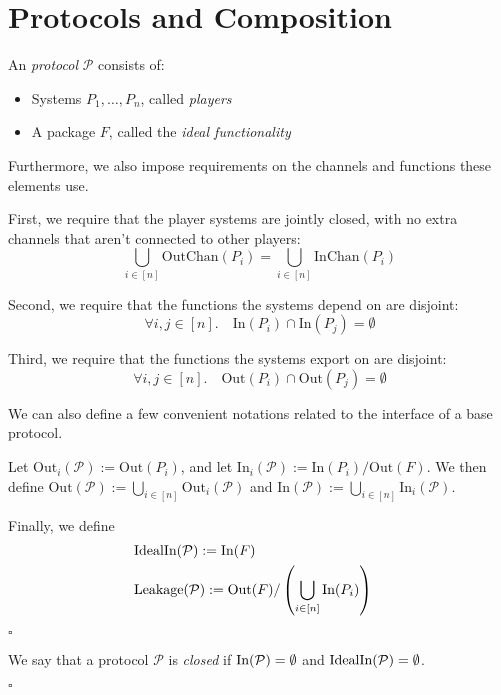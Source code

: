 \section{Protocols and Composition}

\begin{definition}[Protocols]
An \emph{protocol} $\mathcal{P}$ consists of:
\begin{itemize}
\item Systems $P_1, \ldots, P_n$, called \emph{players}
\item A package $F$, called the \emph{ideal functionality}
\end{itemize}

Furthermore, we also impose requirements on the channels and functions
these elements use.

First, we require that the player systems are jointly closed,
with no extra channels that aren't connected to other players:
$$
\bigcup_{i \in [n]} \text{OutChan}(P_i) = \bigcup_{i \in [n]} \text{InChan}(P_i)
$$

Second, we require that the functions the systems depend on are disjoint:
$$
\forall i, j \in [n].\quad \text{In}(P_i) \cap \text{In}(P_j) = \emptyset
$$

Third, we require that the functions the systems export on are disjoint:
$$
\forall i, j \in [n].\quad \text{Out}(P_i) \cap \text{Out}(P_j) = \emptyset
$$

We can also define a few convenient notations related to the interface of a base
protocol.

Let $\text{Out}_i(\mathcal{P}) := \text{Out}(P_i)$, and let $\text{In}_i(\mathcal{P}) := \text{In}(P_i) / \text{Out}(F)$.
We then define $\text{Out}(\mathcal{P}) := \bigcup_{i \in [n]} \text{Out}_i(\mathcal{P})$
and $\text{In}(\mathcal{P}) := \bigcup_{i \in [n]} \text{In}_i(\mathcal{P})$.

Finally, we define
$$
\begin{aligned}
&\text{IdealIn}(\mathcal{P}) := \text{In}(F)\cr
&\text{Leakage}(\mathcal{P}) := \text{Out}(F) / \left(\bigcup_{i \in [n]} \text{In}(P_i)\right)
\end{aligned}
$$

$\square$
\end{definition}

\begin{definition}
  We say that a protocol $\mathcal{P}$ is \emph{closed} if
  $\text{In}(\mathcal{P}) = \emptyset$ and $\text{IdealIn}(\mathcal{P}) = \emptyset$.

  $\square$
\end{definition}

